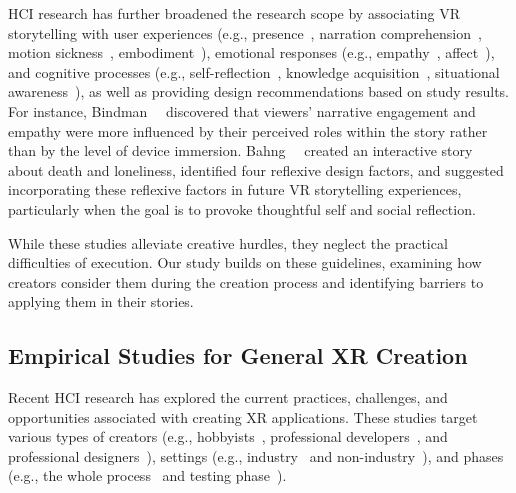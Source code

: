 HCI research has further broadened the research scope by associating VR storytelling with user experiences (e.g., presence~\cite{bindman2018bunny, kroma2022technical, men2017impact}, narration comprehension~\cite{bindman2018bunny, gupta2020investigating}, motion sickness~\cite{han2022evaluating, rahimi2018scene}, embodiment~\cite{liu2022generating}), emotional responses (e.g., empathy~\cite{bindman2018bunny}, affect~\cite{norouzi2021virtual}), and cognitive processes (e.g., self-reflection~\cite{bahng2020reflexive}, knowledge acquisition~\cite{zhang2019exploring, hwang2022being, lee2020data}, situational awareness~\cite{zhu2024reader}), as well as providing design recommendations based on study results. 
For instance, Bindman~\etal~\cite{bindman2018bunny} discovered that viewers' narrative engagement and empathy were more influenced by their perceived roles within the story rather than by the level of device immersion. 
Bahng~\etal~\cite{bahng2020reflexive} created an interactive story about death and loneliness, identified four reflexive design factors, and suggested incorporating these reflexive factors in future VR storytelling experiences, particularly when the goal is to provoke thoughtful self and social reflection.

While these studies alleviate creative hurdles, they neglect the practical difficulties of execution. Our study builds on these guidelines, examining how creators consider them during the creation process and identifying barriers to applying them in their stories.

\subsection{Empirical Studies for General XR Creation}
Recent HCI research has explored the current practices, challenges, and opportunities associated with creating XR applications. These studies target various types of creators (e.g., hobbyists~\cite{ashtari2020creating}, professional developers~\cite{krauss2021current, liu2023challenges, borsting2022software}, and professional designers~\cite{ashtari2020creating, krauss2021current, krauss2022elements}), settings (e.g., industry~\cite{krauss2022elements} and non-industry~\cite{ashtari2020creating, shin2023space}), and phases (e.g., the whole process~\cite{ashtari2020creating, krauss2021current, borsting2022software} and testing phase~\cite{liu2023challenges}). 

